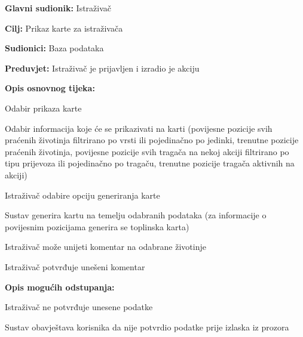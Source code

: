 					
					\noindent {}
					\begin{packed_item}
						
						\item \textbf{Glavni sudionik: }Istraživač
						\item  \textbf{Cilj:} Prikaz karte za istraživača
						\item  \textbf{Sudionici:} Baza podataka
						\item  \textbf{Preduvjet:} Istraživač je prijavljen i izradio je akciju
						\item  \textbf{Opis osnovnog tijeka:}
						
						\item[] \begin{packed_enum}
							
							\item Odabir prikaza karte
							\item Odabir informacija koje će se prikazivati na karti (povijesne pozicije svih praćenih životinja filtrirano po vrsti ili pojedinačno po jedinki, trenutne pozicije praćenih životinja, povijesne pozicije svih tragača na nekoj akciji filtrirano po tipu prijevoza ili pojedinačno po tragaču, trenutne pozicije tragača aktivnih na akciji)
							\item Istraživač odabire opciju generiranja karte
							\item Sustav generira kartu na temelju odabranih podataka (za informacije o povijesnim pozicijama generira se toplinska karta)
							\item Istraživač može unijeti komentar na odabrane životinje
							\item Istraživač potvrđuje unešeni komentar
						\end{packed_enum}
						
						\item  \textbf{Opis mogućih odstupanja:}
						
						\item[] \begin{packed_item}
							
							\item[6.a] Istraživač ne potvrđuje unesene podatke
							\item[] \begin{packed_enum}
								
								\item Sustav obavještava korisnika da nije potvrdio podatke prije izlaska iz prozora
								
							\end{packed_enum}
							
						\end{packed_item}
						
					\end{packed_item}
					
